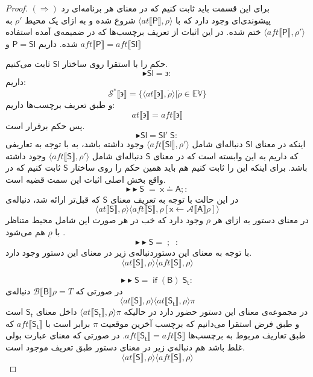 \begin{proof}
	$(\Rightarrow)$
	برای این قسمت باید ثابت کنیم که در معنای هر برنامه‌ای رد پیشوندی‌ای وجود دارد که با
	$\langle at\llbracket \mathsf{P} \rrbracket , \rho \rangle$
	شروع شده و به ازای یک محیط $\rho'$ به 
	$\langle aft\llbracket \mathsf{P} \rrbracket , \rho' \rangle$
	ختم شده. 
	در این اثبات از تعریف برچسب‌ها که در ضمیمه‌ی \cite{calcul} آمده استفاده شده.
	داریم 
	$\mathsf{P=Sl}$
	و 
	$aft \llbracket \mathsf{P} \rrbracket = aft \llbracket \mathsf{Sl} \rrbracket $
	
	حکم را با استقرا روی ساختار $\mathsf{Sl}$ ثابت می‌کنیم. 
	$$\blacktriangleright \mathsf{Sl = \backepsilon}:$$
	داریم:
	$$\mathcal{S^*} \llbracket \backepsilon \rrbracket = \{\langle at \llbracket \backepsilon \rrbracket , \dot{\rho} \rangle | \dot{\rho} \in \mathbb{EV}\}$$
	و طبق تعریف برچسب‌ها داریم:
	$$at \llbracket \backepsilon \rrbracket = aft \llbracket \backepsilon \rrbracket$$
	پس حکم برقرار است.
	$$\blacktriangleright \mathsf{Sl =Sl'\;S}:$$
	اینکه در معنای $\mathsf{Sl}$ دنباله‌ای شامل
	 $\langle aft \llbracket \mathsf{Sl} \rrbracket , \rho '\rangle$ وجود داشته باشد، به با توجه به تعاریفی که داریم به این وابسته است که در معنای $\mathsf{S}$ دنباله‌ای شامل $\langle aft \llbracket \mathsf{S} \rrbracket , \rho' \rangle$ وجود داشته باشد. برای اینکه این را ثابت کنیم هم باید همین حکم را روی ساختار $\mathsf{S}$ ثابت کنیم که در واقع بخش اصلی اثبات این سمت قضیه است. 
	$$\blacktriangleright\blacktriangleright \mathsf{S\;=\; x\doteq A;}:$$
	در این حالت با توجه به تعریف معنای $\mathsf{S}$ که قبل‌تر ارائه شد، دنباله‌ی 
	$$\langle at \llbracket \mathsf{S} \rrbracket ,\rho \rangle \langle aft\llbracket\mathsf{S}\rrbracket , \rho[\mathsf{x}\leftarrow \mathcal{A}\llbracket\mathsf{A}\rrbracket\rho] \rangle $$
	در معنای دستور به ازای هر $\rho$ وجود دارد که خب در هر صورت این شامل محیط متناظر با $\underline{\rho}$ هم می‌شود .
	$$\blacktriangleright\blacktriangleright \mathsf{S=\; ; \;\;}:$$	 
با توجه به معنای این دستوردنباله‌ی زیر در معنای این دستور وجود دارد.
$$\langle at \llbracket \mathsf{S} \rrbracket ,\rho \rangle \langle aft\llbracket\mathsf{S}\rrbracket , \rho \rangle $$

$$\blacktriangleright\blacktriangleright \mathsf{S=\; if\;(B)\;S_t}:$$
	در صورتی که 
	$\mathcal{B}\llbracket\mathsf{B}\rrbracket\rho=\mathit{T}$
	دنباله‌ی 
	$$\langle at \llbracket \mathsf{S} \rrbracket , \rho \rangle
	\langle at \llbracket \mathsf{S_t} \rrbracket , \rho \rangle \pi$$
	در مجموعه‌ی معنای این دستور حضور دارد در حالیکه 
	$\langle at \llbracket \mathsf{S_t} \rrbracket , \rho \rangle \pi$
	داخل معنای $\mathsf{S_t}$ است و طبق فرض استقرا می‌دانیم که برچسب آخرین موقعیت $\pi$ برابر است با $aft \llbracket \mathsf{S_t} \rrbracket$ که طبق تعاریف مربوط به برچسب‌ها 
	$aft \llbracket \mathsf{S_t} \rrbracket=aft \llbracket \mathsf{S} \rrbracket$.
	در صورتی که معنای عبارت بولی غلط باشد هم دنباله‌ی زیر در معنای دستور طبق تعریف موجود است.
	$$\langle at \llbracket \mathsf{S} \rrbracket ,\rho \rangle \langle aft\llbracket\mathsf{S}\rrbracket , \rho \rangle $$
	

\end{proof}
